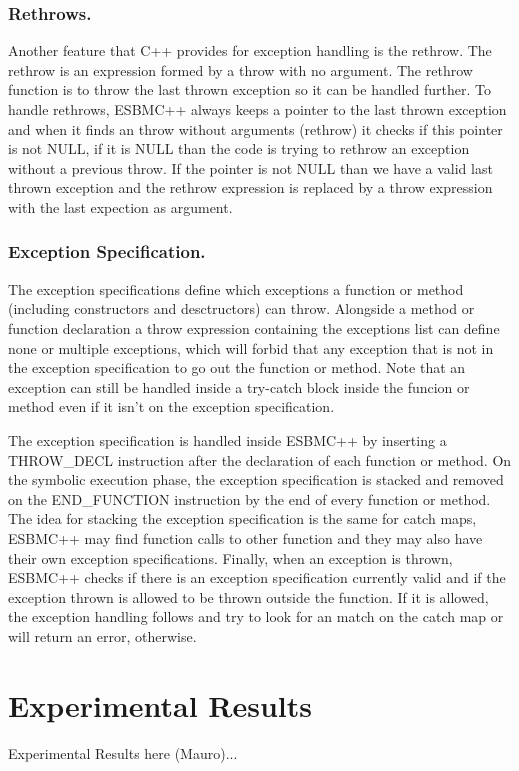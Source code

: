\documentclass[a4paper]{llncs}
\begin{document}
\subsubsection{Rethrows.} Another feature that C++ provides for exception handling is the rethrow. The rethrow is an expression formed by
a throw with no argument. The rethrow function is to throw the last thrown exception so it can be handled further. To handle rethrows, 
ESBMC++ always keeps a pointer to the last thrown exception and when it finds an throw without arguments (rethrow) it checks if this pointer
is not NULL, if it is NULL than the code is trying to rethrow an exception without a previous throw. If the pointer is not NULL than we have
a valid last thrown exception and the rethrow expression is replaced by a throw expression with the last expection as argument.

\subsubsection{Exception Specification.} The exception specifications define which exceptions a function or method (including constructors
and desctructors) can throw. Alongside a method or function declaration a throw expression containing the exceptions list can define none or
multiple exceptions, which will forbid that any exception that is not in the exception specification to go out the function or method. Note 
that an exception can still be handled inside a try-catch block inside the funcion or method even if it isn't on the exception specification.

The exception specification is handled inside ESBMC++ by inserting a THROW\_DECL instruction after the declaration of each function or method.
On the symbolic execution phase, the exception specification is stacked and removed on the END\_FUNCTION instruction by the end of every 
function or method. The idea for stacking the exception specification is the same for catch maps, ESBMC++ may find function calls to other
function and they may also have their own exception specifications. Finally, when an exception is thrown, ESBMC++ checks if there is an
exception specification currently valid and if the exception thrown is allowed to be thrown outside the function. If it is allowed, the 
exception handling follows and try to look for an match on the catch map or will return an error, otherwise.


\section{Experimental Results}
%
Experimental Results here (Mauro)...
\end{document}
